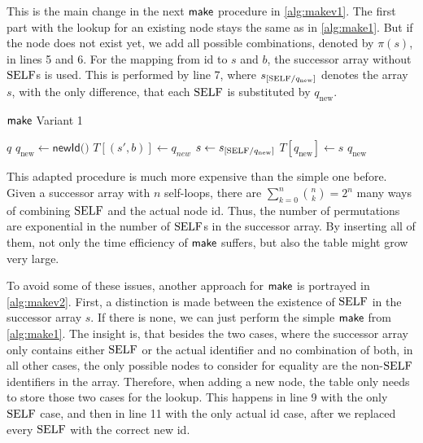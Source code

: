 This is the main change in the next $\operatorname{\textsf{make}}$ procedure in \autoref{alg:makev1}. The first part with the lookup for an existing node stays the same as in \autoref{alg:make1}. But if the node does not exist yet, we add all possible combinations, denoted by $\pi(s)$, in lines 5 and 6. For the mapping from id to $s$ and $b$, the successor array without $\mathrm{SELF}$s is used. This is performed by line 7, where $s_{[\mathrm{SELF} / q_{\text{new}}]}$ denotes the array $s$, with the only difference, that each $\mathrm{SELF}$ is substituted by $q_{\text{new}}$. 
\par
\begin{algorithm}[htb]
\centering
\caption{$\operatorname{\textsf{make}}$ Variant 1}\label{alg:makev1}
\begin{algorithmic}[1]
\Return $q$
\Else
\State $q_{\text{new}} \gets \textsf{newId()}$
\State $T[(s',b)] \gets q_{new}$
\EndFor
\State $s \gets s_{[\mathrm{SELF} / q_{\text{new}}]}$
\State $T[q_{\text{new}}] \gets s$
\Return $q_{\text{new}}$
\EndIf
\end{algorithmic}
\end{algorithm}
This adapted procedure is much more expensive than the simple one before. Given a successor array with $n$ self-loops, there are $\sum_{k=0}^{n} \binom{n}{k} = 2^{n}$ many ways of combining $\mathrm{SELF}$ and the actual node id. Thus, the number of permutations are exponential in the number of $\mathrm{SELF}$s in the successor array. By inserting all of them, not only the time efficiency of $\operatorname{\textsf{make}}$ suffers, but also the table might grow very large.
\par
To avoid some of these issues, another approach for $\operatorname{\textsf{make}}$ is portrayed in \autoref{alg:makev2}. First, a distinction is made between the existence of $\mathrm{SELF}$ in the successor array $s$. If there is none, we can just perform the simple $\operatorname{\textsf{make}}$ from \autoref{alg:make1}.
The insight is, that besides the two cases, where the successor array only contains either $\mathrm{SELF}$ or the actual identifier and no combination of both, in all other cases, the only possible nodes to consider for equality are the non-$\mathrm{SELF}$ identifiers in the array. Therefore, when adding a new node, the table only needs to store those two cases for the lookup. This happens in line 9 with the only $\mathrm{SELF}$ case, and then in line 11 with the only actual id case, after we replaced every $\mathrm{SELF}$ with the correct new id.
